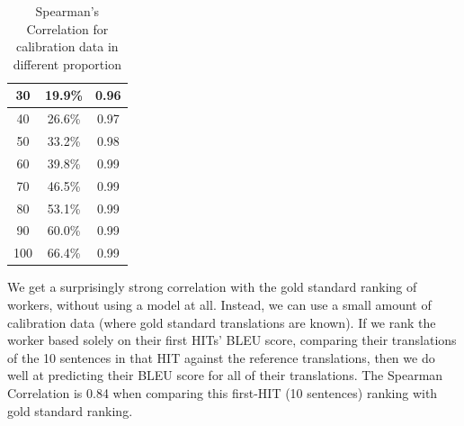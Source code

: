\documentclass[11pt]{article}
\begin{document}
\begin{table}[h]
\begin{center}
\begin{tabular}{|c|c|c|}
30                                               & 19.9\%                                        & 0.96                                                                               \\ \hline
40                                               & 26.6\%                                        & 0.97                                                                               \\ \hline
50                                               & 33.2\%                                        & 0.98                                                                               \\ \hline
60                                               & 39.8\%                                        & 0.99                                                                               \\ \hline
70                                               & 46.5\%                                        & 0.99                                                                               \\ \hline
80                                               & 53.1\%                                        & 0.99                                                                               \\ \hline
90                                               & 60.0\%                                        & 0.99                                                                               \\ \hline
100                                              & 66.4\%                                        & 0.99                                                                               \\ \hline
\end{tabular}
\end{center}
\caption{\label{spearmansen} Spearman's Correlation for calibration data in different proportion}
\end{table}

We get a surprisingly strong correlation with the gold standard ranking of workers, without using a model at all.  Instead, we can use a small amount of calibration data (where gold standard translations are known). If we rank the worker based solely on their first HITs' BLEU score, comparing their translations of the 10 sentences in that HIT against the reference translations, then we do well at predicting their BLEU score for all of their translations. The Spearman Correlation is 0.84 when comparing this first-HIT (10 sentences) ranking with gold standard ranking.  
\end{document}
